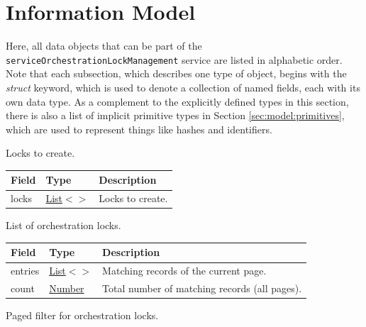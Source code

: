 \documentclass[a4paper]{arrowhead}
\newcommand{\mref}[2][]{{\textcolor{ArrowheadPurple}{\hyperref[sec:model:#2]{\ifstrempty{#1}{#2}{#1}}}}}
\newcommand{\pref}[1]{{\textcolor{ArrowheadGrey}{\hyperref[sec:model:primitives:#1]{#1}}}}
\begin{document}
\section{Information Model}
\label{sec:model}

Here, all data objects that can be part of the \texttt{service\allowbreak{}Orchestration\allowbreak{}Lock\allowbreak{}Management} service are listed in alphabetic order.
Note that each subsection, which describes one type of object, begins with the \textit{struct} keyword, which is used to denote a collection of named fields, each with its own data type.
As a complement to the explicitly defined types in this section, there is also a list of implicit primitive types in Section \ref{sec:model:primitives}, which are used to represent things like hashes and identifiers.


Locks to create.


\noindent\begin{tabularx}{\textwidth}{| >{\raggedright\arraybackslash}p{3.9cm} | >{\raggedright\arraybackslash\small}p{5.3cm} | X |} \hline
\rowcolor{gray!33} Field & Type & Description \\ \hline
locks & \pref{List}$<$\allowbreak{}\mref{OrchestrationLockRequest}$>$ & Locks to create. \\ \hline
\end{tabularx}




List of orchestration locks.


\noindent\begin{tabularx}{\textwidth}{| >{\raggedright\arraybackslash}p{3.9cm} | >{\raggedright\arraybackslash\small}p{5.3cm} | X |} \hline
\rowcolor{gray!33} Field & Type & Description \\ \hline
entries & \pref{List}$<$\allowbreak{}\mref[Orchestration\allowbreak{}Lock\allowbreak{}Response]{OrchestrationLockResponse}$>$ & Matching records of the current page. \\ \hline
count & \pref{Number} & Total number of matching records (all pages). \\ \hline
\end{tabularx}




Paged filter for orchestration locks.
\end{document}
